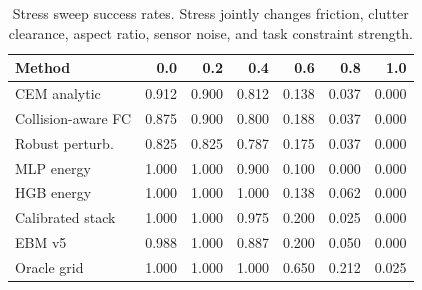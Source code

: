 \begin{table}[t]
\centering
\caption{Stress sweep success rates. Stress jointly changes friction, clutter clearance, aspect ratio, sensor noise, and task constraint strength.}
\label{tab:stress}
\scriptsize
\begin{tabular}{lrrrrrr}
\toprule
Method & 0.0 & 0.2 & 0.4 & 0.6 & 0.8 & 1.0 \\
\midrule
CEM analytic & 0.912 & 0.900 & 0.812 & 0.138 & 0.037 & 0.000 \\
Collision-aware FC & 0.875 & 0.900 & 0.800 & 0.188 & 0.037 & 0.000 \\
Robust perturb. & 0.825 & 0.825 & 0.787 & 0.175 & 0.037 & 0.000 \\
MLP energy & 1.000 & 1.000 & 0.900 & 0.100 & 0.000 & 0.000 \\
HGB energy & 1.000 & 1.000 & 1.000 & 0.138 & 0.062 & 0.000 \\
Calibrated stack & 1.000 & 1.000 & 0.975 & 0.200 & 0.025 & 0.000 \\
EBM v5 & 0.988 & 1.000 & 0.887 & 0.200 & 0.050 & 0.000 \\
Oracle grid & 1.000 & 1.000 & 1.000 & 0.650 & 0.212 & 0.025 \\
\bottomrule
\end{tabular}
\end{table}
